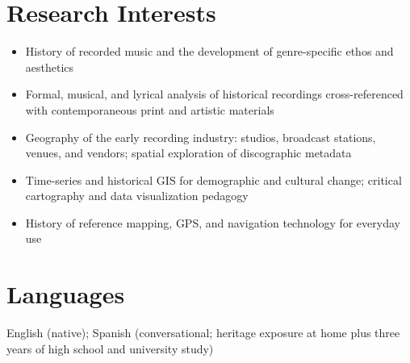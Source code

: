 \documentclass[letterpaper,10pt]{article}
\newlength{\bulletgap}  \setlength{\bulletgap}{0pt}  %
\newlength{\groupindent}\setlength{\groupindent}{0.15in} %
\newcommand{\resumeItem}[1]{\item \small{#1}}
\newif\ifresumecont \resumecontfalse
\newcommand{\resumeItemListStart}{%
  \begin{itemize}[leftmargin=\groupindent, itemsep=\bulletgap,
                  parsep=0pt, topsep=1pt, partopsep=0pt]}
\newcommand{\resumeItemListEnd}{\resumecontfalse\end{itemize}}
\begin{document}
\section{Research Interests}
    \resumeItemListStart
      \resumeItem{\small History of recorded music and the development of genre-specific ethos and aesthetics}
      \resumeItem{\small Formal, musical, and lyrical analysis of historical recordings cross-referenced with contemporaneous print and artistic materials}
      \resumeItem{\small Geography of the early recording industry: studios, broadcast stations, venues, and vendors; spatial exploration of discographic metadata}
      \resumeItem{\small Time-series and historical GIS for demographic and cultural change; critical cartography and data visualization pedagogy}
      \resumeItem{\small History of reference mapping, GPS, and navigation technology for everyday use}
    \resumeItemListEnd



\section{Languages}
 \begin{itemize}[leftmargin=0.15in, label={}]
    \small{\item{
     English (native); Spanish (conversational; heritage exposure at home plus three years of high school and university study)
    }}
 \end{itemize}


\end{document}
